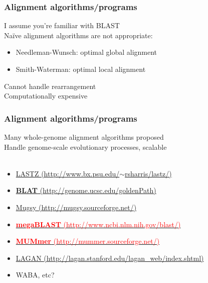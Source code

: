 %
\begin{frame}
  \frametitle{Alignment algorithms/programs}
  \textcolor{hutton_green}{I assume you're familiar with BLAST} \\
  \textcolor{RawSienna}{Na\"{i}ve alignment algorithms are not appropriate}:
  \begin{itemize}
    \item Needleman-Wunsch: optimal global alignment
    \item Smith-Waterman: optimal local alignment
  \end{itemize}
  \textcolor{hutton_blue}{Cannot handle rearrangement} \\
  \textcolor{hutton_purple}{Computationally expensive}  
\end{frame}

%
\begin{frame}
  \frametitle{Alignment algorithms/programs}
  \textcolor{hutton_green}{Many whole-genome alignment algorithms proposed} \\
  Handle genome-scale evolutionary processes, scalable \\~\\
  \begin{itemize}
    \item \href{http://www.bx.psu.edu/~rsharris/lastz/}{LASTZ (http://www.bx.psu.edu/$\sim$rsharris/lastz/)}
    \item \href{http://genome.ucsc.edu/goldenPath/help/blatSpec.html}{\textcolor{hutton_blue}{\textbf{BLAT} (http://genome.ucsc.edu/goldenPath)}}
    \item \href{http://mugsy.sourceforge.net/}{Mugsy (http://mugsy.sourceforge.net/)}
    \item \href{http://www.ncbi.nlm.nih.gov/blast/html/megablast.html}{\textcolor{red}{\textbf{megaBLAST} (http://www.ncbi.nlm.nih.gov/blast/)}}
    \item \href{http://mummer.sourceforge.net/}{\textcolor{red}{\textbf{MUMmer} (http://mummer.sourceforge.net/)}}
    \item \href{http://lagan.stanford.edu/lagan_web/index.shtml}{{\textcolor{hutton_blue}{LAGAN (http://lagan.stanford.edu/lagan\_web/index.shtml)}}}
    \item WABA, etc?
  \end{itemize}
\end{frame}

